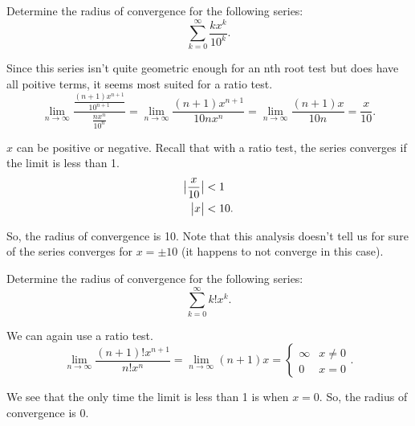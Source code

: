 \begin{example}
	Determine the radius of convergence for the following series:
	\begin{equation*}
		\sum_{k=0}^{\infty}{\frac{kx^k}{10^k}}.
	\end{equation*}
\end{example}
\begin{answer}
	Since this series isn't quite geometric enough for an nth root test but does have all poitive terms, it seems most suited for a ratio test.
	\begin{equation*}
		\lim_{n\to\infty}{\frac{\frac{(n+1)x^{n+1}}{10^{n+1}}}{\frac{nx^n}{10^n}}} = \lim_{n\to\infty}{\frac{(n+1)x^{n+1}}{10nx^n}} = \lim_{n\to\infty}{\frac{(n+1)x}{10n}} = \frac{x}{10}.
	\end{equation*}
	
	$x$ can be positive or negative.
	Recall that with a ratio test, the series converges if the limit is less than 1.
	\begin{align*}
		\big\lvert \frac{x}{10} \big\rvert &< 1 \\
		\big\lvert x \big\rvert &< 10.
	\end{align*}
	
	So, the radius of convergence is 10.
	Note that this analysis doesn't tell us for sure of the series converges for $x=\pm 10$ (it happens to not converge in this case).
\end{answer}

\begin{example}
	Determine the radius of convergence for the following series:
	\begin{equation*}
		\sum_{k=0}^{\infty}{k!x^k}.
	\end{equation*}
\end{example}
\begin{answer}
	We can again use a ratio test.
	\begin{equation*}
		\lim_{n\to\infty}{\frac{(n+1)!x^{n+1}}{n!x^n}} = \lim_{n\to\infty}{(n+1)x} = \begin{cases} \infty & x\neq 0 \\ 0 & x = 0 \end{cases}.
	\end{equation*}
	
	We see that the only time the limit is less than 1 is when $x=0$.
	So, the radius of convergence is 0.
\end{answer}

